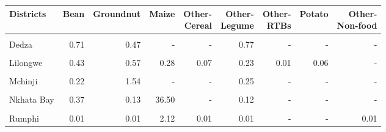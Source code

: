 \begin{table}[!h]
\centering\begingroup\fontsize{7}{9}\selectfont

\begin{tabular}{>{\raggedright\arraybackslash}p{1.8cm}rrrrrrrr}
\toprule
Districts & Bean & Groundnut & Maize & \makecell{Other-\\Cereal} & \makecell{Other-\\Legume} & \makecell{Other-\\RTBs} & Potato & \makecell{Other-\\Non-food}\\
\midrule
\cellcolor{gray!10}{Chitipa} & \cellcolor{gray!10}{0.65} & \cellcolor{gray!10}{0.45} & \cellcolor{gray!10}{0.09} & \cellcolor{gray!10}{0.01} & \cellcolor{gray!10}{0.53} & \cellcolor{gray!10}{-} & \cellcolor{gray!10}{0.02} & \cellcolor{gray!10}{-}\\
Dedza & 0.71 & 0.47 & - & - & 0.77 & - & - & -\\
\cellcolor{gray!10}{Karonga} & \cellcolor{gray!10}{6.16} & \cellcolor{gray!10}{0.64} & \cellcolor{gray!10}{0.38} & \cellcolor{gray!10}{0.02} & \cellcolor{gray!10}{0.25} & \cellcolor{gray!10}{-} & \cellcolor{gray!10}{0.04} & \cellcolor{gray!10}{-}\\
Lilongwe & 0.43 & 0.57 & 0.28 & 0.07 & 0.23 & 0.01 & 0.06 & -\\
\cellcolor{gray!10}{Mangochi} & \cellcolor{gray!10}{0.71} & \cellcolor{gray!10}{1.08} & \cellcolor{gray!10}{-} & \cellcolor{gray!10}{-} & \cellcolor{gray!10}{0.71} & \cellcolor{gray!10}{-} & \cellcolor{gray!10}{-} & \cellcolor{gray!10}{-}\\
\addlinespace
Mchinji & 0.22 & 1.54 & - & - & 0.25 & - & - & -\\
\cellcolor{gray!10}{Mzimba} & \cellcolor{gray!10}{1.42} & \cellcolor{gray!10}{0.99} & \cellcolor{gray!10}{1.05} & \cellcolor{gray!10}{0.09} & \cellcolor{gray!10}{1.02} & \cellcolor{gray!10}{-} & \cellcolor{gray!10}{0.15} & \cellcolor{gray!10}{-}\\
Nkhata Bay & 0.37 & 0.13 & 36.50 & - & 0.12 & - & - & -\\
\cellcolor{gray!10}{Nkhotakota} & \cellcolor{gray!10}{6.99} & \cellcolor{gray!10}{0.57} & \cellcolor{gray!10}{0.41} & \cellcolor{gray!10}{-} & \cellcolor{gray!10}{0.12} & \cellcolor{gray!10}{-} & \cellcolor{gray!10}{-} & \cellcolor{gray!10}{-}\\
Rumphi & 0.01 & 0.01 & 2.12 & 0.01 & 0.01 & - & - & 0.01\\
\bottomrule
\end{tabular}
\endgroup{}
\end{table}
